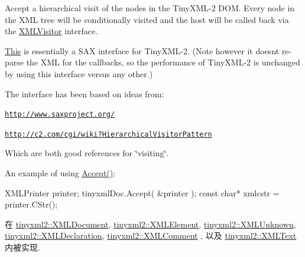 Accept a hierarchical visit of the nodes in the Tiny\+X\+M\+L-\/2 D\+OM. Every node in the X\+ML tree will be conditionally visited and the host will be called back via the \hyperlink{classtinyxml2_1_1_x_m_l_visitor}{X\+M\+L\+Visitor} interface.

\hyperlink{namespace_this}{This} is essentially a S\+AX interface for Tiny\+X\+M\+L-\/2. (Note however it doesn\textquotesingle{}t re-\/parse the X\+ML for the callbacks, so the performance of Tiny\+X\+M\+L-\/2 is unchanged by using this interface versus any other.)

The interface has been based on ideas from\+:


\begin{DoxyItemize}
\item \href{http://www.saxproject.org/}{\tt http\+://www.\+saxproject.\+org/}
\item \href{http://c2.com/cgi/wiki?HierarchicalVisitorPattern}{\tt http\+://c2.\+com/cgi/wiki?\+Hierarchical\+Visitor\+Pattern}
\end{DoxyItemize}

Which are both good references for \char`\"{}visiting\char`\"{}.

An example of using \hyperlink{classtinyxml2_1_1_x_m_l_node_a81e66df0a44c67a7af17f3b77a152785}{Accept()}\+: \begin{DoxyVerb}XMLPrinter printer;
tinyxmlDoc.Accept( &printer );
const char* xmlcstr = printer.CStr();
\end{DoxyVerb}
 

在 \hyperlink{classtinyxml2_1_1_x_m_l_document_ab7be651917a35ab1ff0e4e6d4e565cdf}{tinyxml2\+::\+X\+M\+L\+Document}, \hyperlink{classtinyxml2_1_1_x_m_l_element_a9b2119831e8b85827d5d3e5076788e4a}{tinyxml2\+::\+X\+M\+L\+Element}, \hyperlink{classtinyxml2_1_1_x_m_l_unknown_a8a06b8c82117ca969a432e17a46830fc}{tinyxml2\+::\+X\+M\+L\+Unknown}, \hyperlink{classtinyxml2_1_1_x_m_l_declaration_acf47629d9fc08ed6f1c164a97bcf794b}{tinyxml2\+::\+X\+M\+L\+Declaration}, \hyperlink{classtinyxml2_1_1_x_m_l_comment_a27b37d16cea01b5329dfbbb4f9508e39}{tinyxml2\+::\+X\+M\+L\+Comment} , 以及 \hyperlink{classtinyxml2_1_1_x_m_l_text_a537c60d7e18fb59c45ac2737a29ac47a}{tinyxml2\+::\+X\+M\+L\+Text} 内被实现.

\mbox{\label{classtinyxml2_1_1_x_m_l_node_a363b6edbd6ebd55f8387d2b89f2b0921}} 
